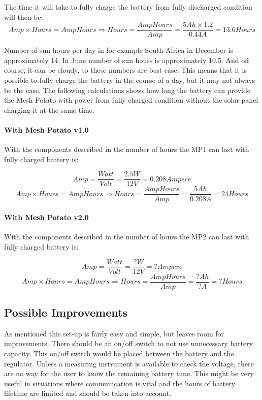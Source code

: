 The time it will take to fully charge the battery from fully discharged condition will then be: 
$$Amp\times Hours = AmpHours \Rightarrow Hours =\frac{AmpHours}{Amp} = \frac{5 Ah\times 1.2}{0.44A} = 13.6 Hours$$

Number of sun hours per day in for example South Africa in December is approximately 14. In June number of sun hours is approximately 10.5. And off course, it can be cloudy, so these numbers are best case. This means that it is possible to fully charge the battery in the course of a day, but it may not always be the case. The following calculations shows how long the battery can provide the Mesh Potato with power from fully charged condition without the solar panel charging it at the same time. 

\paragraph{With Mesh Potato v1.0}
With the components described in  the number of hours the MP1 can last with fully charged battery is: 

$$Amp = \frac{Watt}{Volt} = \frac{2.5 W}{12 V} = 0.208 Ampere$$
$$Amp\times Hours = AmpHours \Rightarrow Hours = \frac{AmpHours}{Amp} = \frac{5 Ah}{0.208 A} = 24 Hours$$

\paragraph{With Mesh Potato v2.0}
With the components described in  the number of hours the MP2 can last with fully charged battery is: 

$$Amp = \frac{Watt}{Volt} = \frac{? W}{12 V} = ? Ampere$$
$$Amp\times Hours = AmpHours \Rightarrow Hours = \frac{AmpHours}{Amp} = \frac{? Ah}{? A} = ? Hours$$


\subsection{Possible Improvements}
As mentioned this set-up is fairly easy and simple, but leaves room for improvements. There should be an on/off switch to not use unnecessary battery capacity. This on/off switch would be placed between the battery and the regulator. Unless a measuring instrument is available to check the voltage, there are no way for the user to know the remaining battery time. This might be very useful in situations where communication is vital and the hours of battery lifetime are limited and should be taken into account. 

